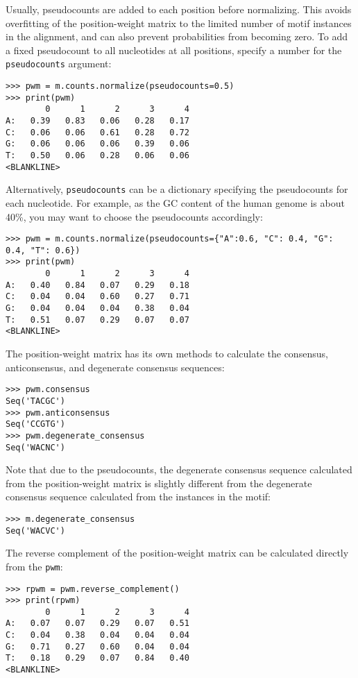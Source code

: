 Usually, pseudocounts are added to each position before normalizing.
This avoids overfitting of the position-weight matrix to the limited
number of motif instances in the alignment, and can also prevent
probabilities from becoming zero. To add a fixed pseudocount to all
nucleotides at all positions, specify a number for the
\verb+pseudocounts+ argument:
\begin{verbatim}
>>> pwm = m.counts.normalize(pseudocounts=0.5)
>>> print(pwm)
        0      1      2      3      4
A:   0.39   0.83   0.06   0.28   0.17
C:   0.06   0.06   0.61   0.28   0.72
G:   0.06   0.06   0.06   0.39   0.06
T:   0.50   0.06   0.28   0.06   0.06
<BLANKLINE>
\end{verbatim}
Alternatively, \verb+pseudocounts+ can be a dictionary specifying the
pseudocounts for each nucleotide. For example, as the GC content of
the human genome is about 40\%, you may want to choose the
pseudocounts accordingly:
\begin{verbatim}
>>> pwm = m.counts.normalize(pseudocounts={"A":0.6, "C": 0.4, "G": 0.4, "T": 0.6})
>>> print(pwm)
        0      1      2      3      4
A:   0.40   0.84   0.07   0.29   0.18
C:   0.04   0.04   0.60   0.27   0.71
G:   0.04   0.04   0.04   0.38   0.04
T:   0.51   0.07   0.29   0.07   0.07
<BLANKLINE>
\end{verbatim}
The position-weight matrix has its own methods to calculate the
consensus, anticonsensus, and degenerate consensus sequences:
\begin{verbatim}
>>> pwm.consensus
Seq('TACGC')
>>> pwm.anticonsensus
Seq('CCGTG')
>>> pwm.degenerate_consensus
Seq('WACNC')
\end{verbatim}
Note that due to the pseudocounts, the degenerate consensus sequence
calculated from the position-weight matrix is slightly different
from the degenerate consensus sequence calculated from the instances
in the motif:
\begin{verbatim}
>>> m.degenerate_consensus
Seq('WACVC')
\end{verbatim}
The reverse complement of the position-weight matrix can be calculated directly from the \verb+pwm+:
\begin{verbatim}
>>> rpwm = pwm.reverse_complement()
>>> print(rpwm)
        0      1      2      3      4
A:   0.07   0.07   0.29   0.07   0.51
C:   0.04   0.38   0.04   0.04   0.04
G:   0.71   0.27   0.60   0.04   0.04
T:   0.18   0.29   0.07   0.84   0.40
<BLANKLINE>
\end{verbatim}

